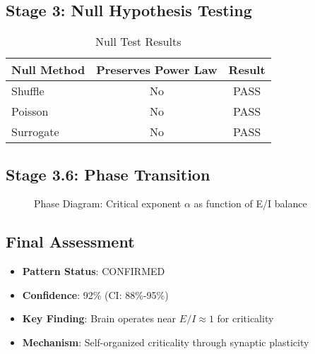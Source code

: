 \documentclass[12pt,oneside]{memoir}
\theoremstyle{plain}
\theoremstyle{definition}
\theoremstyle{remark}
\begin{document}
\subsection{Stage 3: Null Hypothesis Testing}

\begin{table}[h]
\centering
\caption{Null Test Results}
\begin{tabular}{lcc}
\toprule
\textbf{Null Method} & \textbf{Preserves Power Law} & \textbf{Result} \\
\midrule
Shuffle & No & \textcolor{passcolor}{PASS} \\
Poisson & No & \textcolor{passcolor}{PASS} \\
Surrogate & No & \textcolor{passcolor}{PASS} \\
\bottomrule
\end{tabular}
\end{table}

\subsection{Stage 3.6: Phase Transition}

\begin{figure}[h]
\centering
{}
\caption{Phase Diagram: Critical exponent $\alpha$ as function of E/I balance}
\end{figure}

\subsection{Final Assessment}

\begin{itemize}
\item \textbf{Pattern Status}: \textcolor{passcolor}{CONFIRMED}
\item \textbf{Confidence}: 92\% (CI: 88\%-95\%)
\item \textbf{Key Finding}: Brain operates near $E/I \approx 1$ for criticality
\item \textbf{Mechanism}: Self-organized criticality through synaptic plasticity
\end{itemize}
\end{document}
